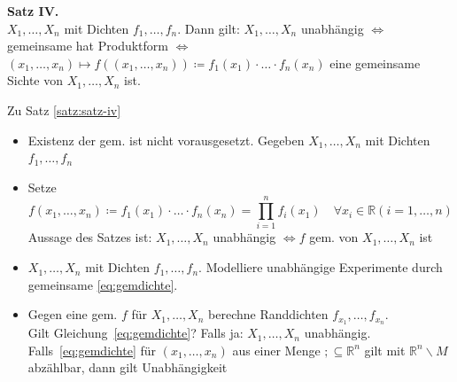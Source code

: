 \begin{satz}
    \label{satz:satz-iv}
    \textbf{Satz IV.}   \\
    $X_1, \dots, X_n$ mit Dichten  $f_1, \dots, f_n$.
    Dann gilt:
    $X_1, \dots, X_n$ unabhängig $\Leftrightarrow$ gemeinsame \dichte hat Produktform $\Leftrightarrow$ $(x_1, \dots, x_n) \mapsto f((x_1, \dots, x_n)) \coloneqq  f_1(x_1)\cdot \dots \cdot f_n(x_n)$ eine gemeinsame Sichte von $X_1, \dots, X_n$ ist.
\end{satz}

\begin{bem}
    Zu Satz \autoref{satz:satz-iv}  \\
    \begin{itemize}
        \item Existenz der gem. \dichte ist nicht vorausgesetzt.
        Gegeben $X_1, \dots, X_n$ mit Dichten  $f_1, \dots, f_n$
        \item Setze
        \begin{equation}
            \label{eq:gemdichte}
            f(x_1, \dots, x_n) \coloneqq  f_1(x_1) \cdot \dots \cdot f_n(x_n) = \prod^n_{i=1} f_i(x_1) \quad \forall
            x_i \in
            \mathbb{R} (i=1, \dots, n)
        \end{equation}
        Aussage des Satzes ist: $X_1, \dots, X_n$ unabhängig $\Leftrightarrow f$ gem. \dichte von $X_1, \dots, X_n$ ist
        \item $X_1, \dots, X_n$ mit Dichten  $f_1, \dots, f_n$.
        Modelliere unabhängige Experimente durch gemeinsame \dichte \eqref{eq:gemdichte}.
        \item Gegen eine gem. \dichte $f$ für $X_1, \dots, X_n$ berechne Randdichten $f_{x_1}, \dots, f_{x_n}$. \\
        Gilt Gleichung~\eqref{eq:gemdichte}? Falls ja: $X_1, \dots, X_n$ unabhängig.
        Falls~\eqref{eq:gemdichte} für $(x_1, \dots, x_n)$ aus einer Menge $; \subseteq \mathbb{R}^n$ gilt mit $\mathbb{R}^n\backslash M$ abzählbar, dann gilt Unabhängigkeit
    \end{itemize}
\end{bem}




